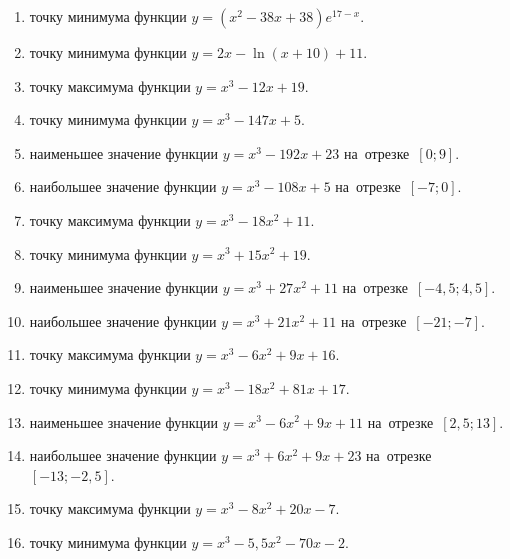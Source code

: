 \documentclass[a4paper,10pt]{article}
\begin{document}
\begin{enumerate}
\item {} точку минимума функции $y=\left(x^2-38x+38\right){{e}^{17-x}}$.

\item {} точку минимума функции $y=2x-\ln \left(x+10\right)+11$.

\item {} точку максимума функции $y=x^3 -12x +19$.

\item {} точку минимума функции $y=x^3 -147x+5$.

\item {} наименьшее значение функции $y=x^3 -192x+23$ на~отрезке~$\left[0;9\right]$.

\item {} наибольшее значение функции $y=x^3 -108x+5$ на~отрезке~$\left[-7;0\right]$.

\item {} точку максимума функции $y=x^3 -18x^2+11$.

\item {} точку минимума функции $y=x^3 +15x^2+19$.

\item {} наименьшее значение функции $y=x^3 +27x^2+11$ на~отрезке~$\left[-4,5;4,5\right]$.

\item {} наибольшее значение функции $y=x^3 +21x^2+11$ на~отрезке~$\left[-21;-7\right]$.

\item {} точку максимума функции $y=x^3 -6x^2+9x+16$.

\item {} точку минимума функции $y=x^3 -18x^2+81x+17$.

\item {} наименьшее значение функции $y=x^3 -6x^2+9x+11$ на~отрезке~$\left[2,5;13\right]$.

\item {} наибольшее значение функции $y=x^3 +6x^2+9x+23$ на~отрезке~$\left[-13;-2,5\right]$.

\item {} точку максимума функции $y=x^3 -8x^2+20x-7$.

\item {} точку минимума функции $y=x^3 -5,5x^2-70x-2$.


\end{enumerate}
\end{document}
